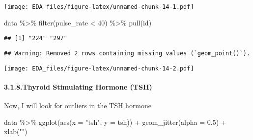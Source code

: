 \documentclass[
]{article}
\newenvironment{Shaded}{\begin{snugshade}}{\end{snugshade}}
\newcommand{\AttributeTok}[1]{\textcolor[rgb]{0.77,0.63,0.00}{#1}}
\newcommand{\CommentTok}[1]{\textcolor[rgb]{0.56,0.35,0.01}{\textit{#1}}}
\newcommand{\ConstantTok}[1]{\textcolor[rgb]{0.00,0.00,0.00}{#1}}
\newcommand{\DecValTok}[1]{\textcolor[rgb]{0.00,0.00,0.81}{#1}}
\newcommand{\FloatTok}[1]{\textcolor[rgb]{0.00,0.00,0.81}{#1}}
\newcommand{\FunctionTok}[1]{\textcolor[rgb]{0.00,0.00,0.00}{#1}}
\newcommand{\NormalTok}[1]{#1}
\newcommand{\OtherTok}[1]{\textcolor[rgb]{0.56,0.35,0.01}{#1}}
\newcommand{\SpecialCharTok}[1]{\textcolor[rgb]{0.00,0.00,0.00}{#1}}
\newcommand{\StringTok}[1]{\textcolor[rgb]{0.31,0.60,0.02}{#1}}
\begin{document}
\texttt{[image: EDA\_files/figure-latex/unnamed-chunk-14-1.pdf]}

\begin{Shaded}
\begin{Highlighting}[]
\NormalTok{data }\SpecialCharTok{\%\textgreater{}\%} 
  \FunctionTok{filter}\NormalTok{(pulse\_rate }\SpecialCharTok{\textless{}} \DecValTok{40}\NormalTok{) }\SpecialCharTok{\%\textgreater{}\%} 
  \FunctionTok{pull}\NormalTok{(id)}
\end{Highlighting}
\end{Shaded}

\begin{verbatim}
## [1] "224" "297"
\end{verbatim}

\begin{Shaded}
\end{Shaded}

\begin{verbatim}
## Warning: Removed 2 rows containing missing values (`geom_point()`).
\end{verbatim}

\texttt{[image: EDA\_files/figure-latex/unnamed-chunk-14-2.pdf]}

\hypertarget{thyroid-stimulating-hormone-tsh}{%
\paragraph{3.1.8.Thyroid Stimulating Hormone
(TSH)}\label{thyroid-stimulating-hormone-tsh}}

Now, I will look for outliers in the TSH hormone

\begin{Shaded}
\begin{Highlighting}[]
\NormalTok{data }\SpecialCharTok{\%\textgreater{}\%} 
  \FunctionTok{ggplot}\NormalTok{(}\FunctionTok{aes}\NormalTok{(}\AttributeTok{x =} \StringTok{"tsh"}\NormalTok{, }\AttributeTok{y =}\NormalTok{ tsh)) }\SpecialCharTok{+}
  \FunctionTok{geom\_jitter}\NormalTok{(}\AttributeTok{alpha =} \FloatTok{0.5}\NormalTok{) }\SpecialCharTok{+}
  \FunctionTok{xlab}\NormalTok{(}\StringTok{""}\NormalTok{)}
\end{Highlighting}
\end{Shaded}
\end{document}
